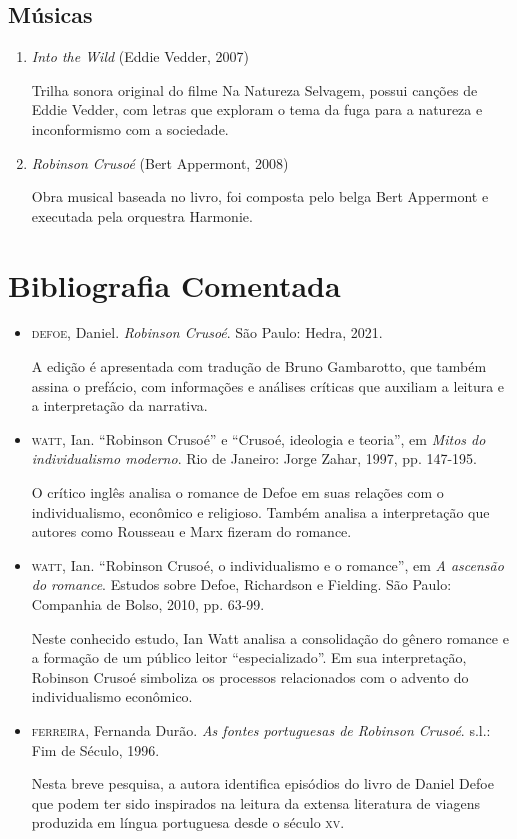 \documentclass[12pt]{extarticle}
\begin{document}
\subsection{Músicas}

\begin{enumerate}

\item \emph{Into the Wild} (Eddie Vedder, 2007)

Trilha sonora original do filme Na Natureza Selvagem, possui canções de Eddie Vedder, com
letras que exploram o tema da fuga para a natureza e inconformismo com a sociedade. 

\item \emph{Robinson Crusoé} (Bert Appermont, 2008)

Obra musical baseada no livro, foi composta pelo belga Bert Appermont e executada pela orquestra Harmonie.

\end{enumerate}

\pagebreak\section{Bibliografia Comentada}

\begin{itemize}

\item \textsc{defoe}, Daniel. \emph{Robinson Crusoé}. São Paulo: Hedra, 2021.


A edição é apresentada com tradução de Bruno Gambarotto, que também
assina o prefácio, com informações e análises críticas que auxiliam a
leitura e a interpretação da narrativa.


\item \textsc{watt}, Ian. ``Robinson Crusoé'' e ``Crusoé, ideologia e teoria'', em
\emph{Mitos do individualismo moderno}. Rio de Janeiro: Jorge Zahar,
1997, pp. 147-195.


O crítico inglês analisa o romance de Defoe em suas relações com o
individualismo, econômico e religioso. Também analisa a interpretação
que autores como Rousseau e Marx fizeram do romance.


\item \textsc{watt}, Ian. ``Robinson Crusoé, o individualismo e o romance'', em \emph{A
ascensão do romance}. Estudos sobre Defoe, Richardson e Fielding. São
Paulo: Companhia de Bolso, 2010, pp. 63-99.


Neste conhecido estudo, Ian Watt analisa a consolidação do gênero
romance e a formação de um público leitor ``especializado''. Em sua
interpretação, Robinson Crusoé simboliza os processos relacionados com
o advento do individualismo econômico.


\item \textsc{ferreira}, Fernanda Durão. \emph{As fontes portuguesas de Robinson
Crusoé}. s.l.: Fim de Século, 1996.


Nesta breve pesquisa, a autora identifica episódios do livro de Daniel
Defoe que podem ter sido inspirados na leitura da extensa literatura de
viagens produzida em língua portuguesa desde o século \textsc{xv}.
\end{itemize}
\end{document}
